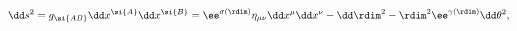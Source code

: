 \begin{equation}\label{eq:metric}
\dd s^2=g_{\si{AB}} \dd x^{\si{A}} \dd x^{\si{B}} =
\ee^{\sigma(\rdim)}\eta_{\mu\nu} \dd x^\mu\dd x^\nu
-\dd\rdim^2-\rdim^2\ee^{\gamma(\rdim)}\dd\theta^2,
\end{equation}

